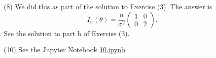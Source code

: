 \documentclass[10pt]{article}
\begin{document}
\begin{enumerate}
\begin{enumerate}[(a)]
\end{enumerate}

\item[(8)]
We did this as part of the solution to Exercise (3). The answer is
\[
I_n(\theta) = \frac{n}{\sigma^2} \begin{pmatrix} 1 & 0 \\ 0 & 2 \end{pmatrix}.
\]
See the solution to part b of Exercise (3).

\item[(10)]
See the Jupyter Notebook
\href{https://github.com/ajrasmus/some_of_statistics/blob/main/chapter_9/10.ipynb}{10.ipynb}.
\end{enumerate}
\end{document}
